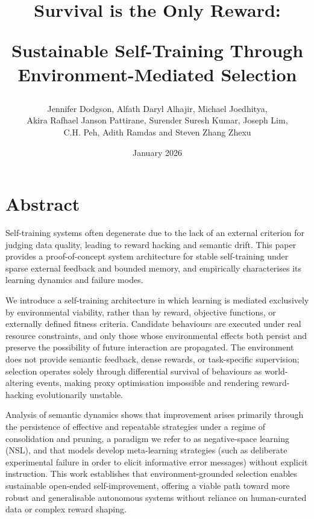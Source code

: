 \documentclass{article}
\title{Survival is the Only Reward: 

Sustainable Self-Training Through Environment-Mediated Selection}
\author{Jennifer Dodgson, Alfath Daryl Alhajir, Michael Joedhitya, \\ Akira Rafhael Janson Pattirane, Surender Suresh Kumar, Joseph Lim, \\ C.H. Peh, Adith Ramdas and Steven Zhang Zhexu}
\date{January 2026}
\begin{document}
\maketitle

\section{Abstract}
Self-training systems often degenerate due to the lack of an external criterion for judging data quality, leading to reward hacking and semantic drift. This paper provides a proof-of-concept system architecture for stable self-training under sparse external feedback and bounded memory, and empirically characterises its learning dynamics and failure modes. 

We introduce a self-training architecture in which learning is mediated exclusively by environmental viability, rather than by reward, objective functions, or externally defined fitness criteria. Candidate behaviours are executed under real resource constraints, and only those whose environmental effects both persist and preserve the possibility of future interaction are propagated. The environment does not provide semantic feedback, dense rewards, or task-specific supervision; selection operates solely through differential survival of behaviours as world-altering events, making proxy optimisation impossible and rendering reward-hacking evolutionarily unstable.

Analysis of semantic dynamics shows that improvement arises primarily through the persistence of effective and repeatable strategies under a regime of consolidation and pruning, a paradigm we refer to as negative-space learning (NSL), and that models develop meta-learning strategies (such as deliberate experimental failure in order to elicit informative error messages) without explicit instruction. This work establishes that environment-grounded selection enables sustainable open-ended self-im\-prove\-ment, offering a viable path toward more robust and generalisable autonomous systems without reliance on human-curated data or complex reward shaping.
\end{document}
